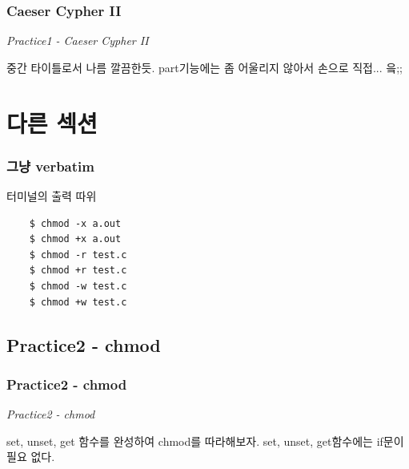 \documentclass{beamer}
\begin{document}
\begin{frame}
	\frametitle{Caeser Cypher II}
	{\em \Large Practice1 - Caeser Cypher II}

	\vspace{5mm}
	중간 타이틀로서 나름 깔끔한듯.
	part기능에는 좀 어울리지 않아서 손으로 직접... 읔;;
\end{frame}

\section{다른 섹션}

\begin{frame}[containsverbatim]
	\frametitle{그냥 verbatim}
	터미널의 출력 따위
	\begin{verbatim}
	$ chmod -x a.out
	$ chmod +x a.out
	$ chmod -r test.c
	$ chmod +r test.c
	$ chmod -w test.c
	$ chmod +w test.c
	\end{verbatim}
\end{frame}

\subsection{Practice2 - chmod}

\begin{frame}
	\frametitle{Practice2 - chmod}
	{\em \Large Practice2 - chmod}

	\vspace{5mm}
	set, unset, get 함수를 완성하여 chmod를 따라해보자.
	set, unset, get함수에는 if문이 필요 없다.
\end{frame}
\end{document}
